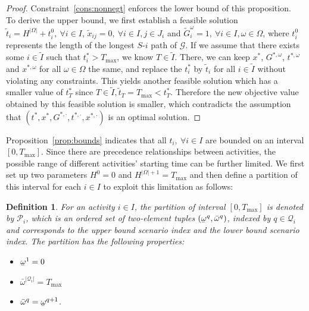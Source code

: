 \documentclass[11pt]{article}
\newtheorem{definition}{Definition}
\newcommand{\noi}{\noindent}
\renewcommand{\underbar}{\underaccent{\bar}}
\begin{document}
	\begin{proof}
		Constraint~\eqref{cons:nonnegt} enforces the lower bound of this proposition. \\
		\newline 
		To derive the upper bound, 
		we first establish a feasible solution \(\tilde{t}_i = H^{|\Omega|} + t^0_i,\ \forall i \in I\), \(\tilde{x}_{ij} = 0,\ \forall i \in I, j \in J_i\) and \(\tilde{G}_i^\omega = 1,\ \forall i \in I, \omega \in \Omega\), where \(t^0_i\) represents the length of the longest \(S\)-\(i\) path of \(\mathcal{G}\). 
		If we assume that there exists some \(i \in \tilde{I}\) such that \(t_i^* > T_{\max}\), we know \(T \in \tilde{I}\). There, we can keep \(x^*\), \(G^{*,\omega}\), \(t^{*,\omega}\) and \(x^{*,\omega}\) for all \(\omega \in \Omega\) the same, and replace the \(t_i^*\) by \(\tilde{t}_i\) for all \(i \in \tilde{I}\) without violating any constraints. This yields another feasible solution which has a smaller value of \(t_T^*\) since \(T \in \tilde{I}, \tilde{t}_T = T_{\max} < t_T^*\). Therefore the new objective value obtained by this feasible solution is smaller, which contradicts the assumption that \((t^*,x^*,G^{*,\cdot},t^{*,\cdot},x^{*,\cdot})\) is an optimal solution.
	\end{proof}
	\noi Proposition~\ref{prop:bounds} indicates that all \(t_i,\ \forall i \in I\) are bounded on an interval \([0,T_{\max}]\). Since there are precedence relationships between activities, the possible range of different activities' starting time can be further limited. We first set up two parameters \(H^0 = 0\) and \(H^{|\Omega| + 1} = T_{\max}\) and then define a partition of this interval for each \(i \in I\) to exploit this limitation as follows:
	\begin{definition}
		For an activity \(i \in I\), the partition of interval \([0,T_{\max}]\) is denoted by \(\mathcal{P}_i\), which is an ordered set of two-element tuples \((\underbar{\omega}^q,\bar{\omega}^q)\), indexed by \(q \in \mathcal{Q}_i\) and corresponds to the upper bound scenario index and the lower bound scenario index. The partition has the following properties:
		\begin{itemize}
			\item \(\underbar{\omega}^1 = 0\)
			\item \(\bar{\omega}^{|\mathcal{Q}_i|} = T_{\max}\)
			\item \(\bar{\omega}^q = \underbar{\omega}^{q + 1}\).
		\end{itemize}
	\end{definition}
\end{document}
